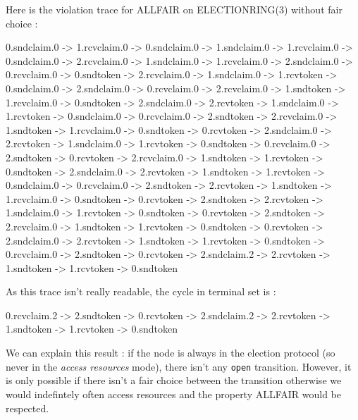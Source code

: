 \documentclass{article}
\begin{document}
Here is the violation trace for ALLFAIR on ELECTIONRING(3) without fair choice :

\begin{spverbatim}
0.sndclaim.0 -> 1.rcvclaim.0  -> 0.sndclaim.0 -> 1.sndclaim.0 -> 1.rcvclaim.0 -> 0.sndclaim.0 -> 2.rcvclaim.0 -> 1.sndclaim.0 -> 1.rcvclaim.0 -> 2.sndclaim.0 -> 0.rcvclaim.0 -> 0.sndtoken -> 2.rcvclaim.0 -> 1.sndclaim.0 -> 1.rcvtoken -> 0.sndclaim.0 -> 2.sndclaim.0 -> 0.rcvclaim.0 -> 2.rcvclaim.0 -> 1.sndtoken -> 1.rcvclaim.0 -> 0.sndtoken -> 2.sndclaim.0 -> 2.rcvtoken -> 1.sndclaim.0 -> 1.rcvtoken -> 0.sndclaim.0 -> 0.rcvclaim.0 -> 2.sndtoken -> 2.rcvclaim.0 -> 1.sndtoken -> 1.rcvclaim.0 -> 0.sndtoken -> 0.rcvtoken -> 2.sndclaim.0 -> 2.rcvtoken -> 1.sndclaim.0 -> 1.rcvtoken -> 0.sndtoken -> 0.rcvclaim.0 -> 2.sndtoken -> 0.rcvtoken -> 2.rcvclaim.0 -> 1.sndtoken -> 1.rcvtoken -> 0.sndtoken -> 2.sndclaim.0 -> 2.rcvtoken -> 1.sndtoken -> 1.rcvtoken -> 0.sndclaim.0 -> 0.rcvclaim.0 -> 2.sndtoken -> 2.rcvtoken -> 1.sndtoken -> 1.rcvclaim.0 -> 0.sndtoken -> 0.rcvtoken -> 2.sndtoken -> 2.rcvtoken -> 1.sndclaim.0 -> 1.rcvtoken -> 0.sndtoken -> 0.rcvtoken -> 2.sndtoken -> 2.rcvclaim.0 -> 1.sndtoken -> 1.rcvtoken -> 0.sndtoken -> 0.rcvtoken -> 2.sndclaim.0 -> 2.rcvtoken -> 1.sndtoken -> 1.rcvtoken -> 0.sndtoken -> 0.rcvclaim.0 -> 2.sndtoken -> 0.rcvtoken -> 2.sndclaim.2 -> 2.rcvtoken -> 1.sndtoken -> 1.rcvtoken -> 0.sndtoken
\end{spverbatim}
\bigskip

As this trace isn't really readable, the cycle in terminal set is : \newline

\begin{spverbatim}
0.rcvclaim.2 -> 2.sndtoken -> 0.rcvtoken -> 2.sndclaim.2 -> 2.rcvtoken -> 1.sndtoken -> 1.rcvtoken -> 0.sndtoken
\end{spverbatim}
\bigskip

We can explain this result : if the node is always in the election protocol (so never in the \textit{access resources} mode), there isn't any \verb#open# transition. However, it is only possible if there isn't a fair choice between the transition otherwise we would indefintely often access resources and the property ALLFAIR would be respected.


\end{document}
